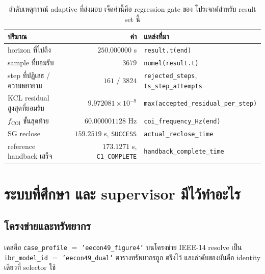 \documentclass[12pt,a4paper]{article}
\theoremstyle{remark}
\newcommand{\code}[1]{\texttt{\small #1}}
\begin{document}
\begin{table}[H]
\centering
\small
\begin{tabularx}{\textwidth}{@{}lrX@{}}
\toprule
\textbf{ปริมาณ} & \textbf{ค่า} & \textbf{แหล่งที่มา}\\
\midrule
horizon ที่ไปถึง & $250.000000$ s & \code{result.t(end)}\\
sample ที่ยอมรับ & $3679$ & \code{numel(result.t)}\\
step ที่ปฏิเสธ / ความพยายาม & $161$ / $3824$ & \code{rejected\_steps}, \code{ts\_step\_attempts}\\
KCL residual สูงสุดที่ยอมรับ & $9.972081\times10^{-9}$ & \code{max(accepted\_residual\_per\_step)}\\
$f_{\mathrm{COI}}$ ขั้นสุดท้าย & $60.000001128$ Hz & \code{coi\_frequency\_Hz(end)}\\
SG reclose & $159.2519$ s, \code{SUCCESS} & \code{actual\_reclose\_time}\\
reference handback เสร็จ & $173.1271$ s, \code{C1\_COMPLETE} & \code{handback\_complete\_time}\\
\bottomrule
\end{tabularx}
\caption{ลำดับเหตุการณ์ adaptive ที่ส่งมอบ เจ็ดค่านี้คือ regression gate ของ
โปรเจกต์สำหรับ result set นี้}
\end{table}

\section{ระบบที่ศึกษา และ supervisor มีไว้ทำอะไร}

\subsection{โครงข่ายและทรัพยากร}

เคสคือ \code{case\_profile} $=$ \code{'eecon49\_figure4'} บนโครงข่าย IEEE-14
resolve เป็น \code{ibr\_model\_id} $=$ \code{'eecon49\_dual'} ตารางทรัพยากรถูก
ตรึงไว้ และลำดับของมันคือ identity เดียวที่ selector ใช้
\end{document}
